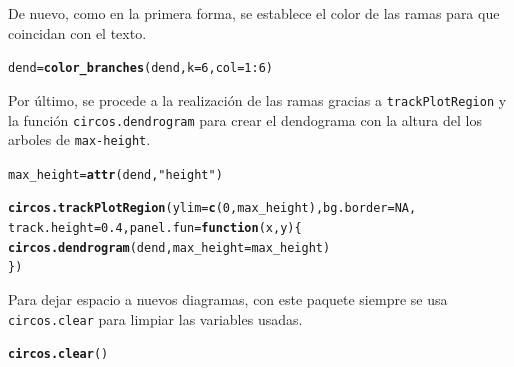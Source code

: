 \documentclass{article}\usepackage[]{graphicx}\usepackage[]{color}
\makeatletter
\newcommand{\hlnum}[1]{\textcolor[rgb]{0.686,0.059,0.569}{#1}}%
\newcommand{\hlstr}[1]{\textcolor[rgb]{0.192,0.494,0.8}{#1}}%
\newcommand{\hlopt}[1]{\textcolor[rgb]{0,0,0}{#1}}%
\newcommand{\hlstd}[1]{\textcolor[rgb]{0.345,0.345,0.345}{#1}}%
\newcommand{\hlkwa}[1]{\textcolor[rgb]{0.161,0.373,0.58}{\textbf{#1}}}%
\newcommand{\hlkwb}[1]{\textcolor[rgb]{0.69,0.353,0.396}{#1}}%
\newcommand{\hlkwc}[1]{\textcolor[rgb]{0.333,0.667,0.333}{#1}}%
\newcommand{\hlkwd}[1]{\textcolor[rgb]{0.737,0.353,0.396}{\textbf{#1}}}%
\newenvironment{kframe}{%
 \def\at@end@of@kframe{}%
 \ifinner\ifhmode%
  \def\at@end@of@kframe{\end{minipage}}%
  \begin{minipage}{\columnwidth}%
 \fi\fi%
 \def\FrameCommand##1{\hskip\@totalleftmargin \hskip-\fboxsep
 \colorbox{shadecolor}{##1}\hskip-\fboxsep
     \hskip-\linewidth \hskip-\@totalleftmargin \hskip\columnwidth}%
 \MakeFramed {\advance\hsize-\width
   \@totalleftmargin\z@ \linewidth\hsize
   \@setminipage}}%
 {\par\unskip\endMakeFramed%
 \at@end@of@kframe}
\newenvironment{knitrout}{}{} %
\makeatother
\begin{document}
De nuevo, como en la primera forma, se establece el color de las ramas para que coincidan con el texto.
\begin{knitrout}
\color{fgcolor}\begin{kframe}
\begin{alltt}
\hlstd{dend} \hlkwb{=} \hlkwd{color_branches}\hlstd{(dend,} \hlkwc{k} \hlstd{=} \hlnum{6}\hlstd{,} \hlkwc{col} \hlstd{=} \hlnum{1}\hlopt{:}\hlnum{6}\hlstd{)}
\end{alltt}
\end{kframe}
\end{knitrout}
Por \'ultimo, se procede a la realizaci\'on de las ramas gracias a \texttt{trackPlotRegion} y la funci\'on \texttt{circos.dendrogram} para crear el dendograma con la altura del los arboles de \texttt{max-height}.
\begin{knitrout}
\color{fgcolor}\begin{kframe}
\begin{alltt}
\hlstd{max_height} \hlkwb{=} \hlkwd{attr}\hlstd{(dend,} \hlstr{"height"}\hlstd{)}
\end{alltt}
\end{kframe}
\end{knitrout}
\begin{knitrout}
\color{fgcolor}\begin{kframe}
\begin{alltt}
\hlkwd{circos.trackPlotRegion}\hlstd{(}\hlkwc{ylim} \hlstd{=} \hlkwd{c}\hlstd{(}\hlnum{0}\hlstd{, max_height),} \hlkwc{bg.border} \hlstd{=} \hlnum{NA}\hlstd{,}
                       \hlkwc{track.height} \hlstd{=} \hlnum{0.4}\hlstd{,} \hlkwc{panel.fun} \hlstd{=} \hlkwa{function}\hlstd{(}\hlkwc{x}\hlstd{,} \hlkwc{y}\hlstd{) \{}
                         \hlkwd{circos.dendrogram}\hlstd{(dend,} \hlkwc{max_height} \hlstd{= max_height)}
                       \hlstd{\})}
\end{alltt}
\end{kframe}
\end{knitrout}
Para dejar espacio a nuevos diagramas, con este paquete siempre se usa \texttt{circos.clear} para limpiar las variables usadas.
\begin{knitrout}
\color{fgcolor}\begin{kframe}
\begin{alltt}
\hlkwd{circos.clear}\hlstd{()}
\end{alltt}
\end{kframe}
\end{knitrout}
\end{document}
